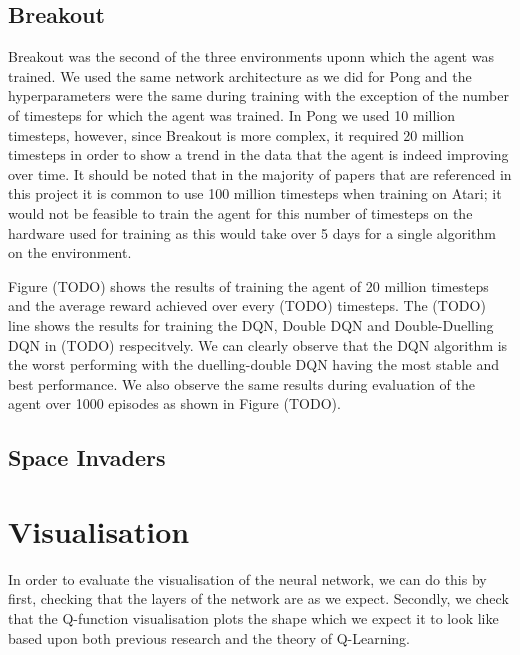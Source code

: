 \subsection{Breakout}
Breakout was the second of the three environments uponn which the agent was trained. We used the same network architecture as we did for Pong and the hyperparameters were the same during training with the exception of the number of timesteps for which the agent was trained. In Pong we used 10 million timesteps, however, since Breakout is more complex, it required 20 million timesteps in order to show a trend in the data that the agent is indeed improving over time. It should be noted that in the majority of papers that are referenced in this project it is common to use 100 million timesteps when training on Atari; it would not be feasible to train the agent for this number of timesteps on the hardware used for training as this would take over 5 days for a single algorithm on the environment.

Figure (TODO) shows the results of training the agent of 20 million timesteps and the average reward achieved over every (TODO) timesteps. The (TODO) line shows the results for training the DQN, Double DQN and Double-Duelling DQN in (TODO) respecitvely. We can clearly observe that the DQN algorithm is the worst performing with the duelling-double DQN having the most stable and best performance. We also observe the same results during evaluation of the agent over 1000 episodes as shown in Figure (TODO).

\subsection{Space Invaders}


\section{Visualisation}
In order to evaluate the visualisation of the neural network, we can do this by first, checking that the layers of the network are as we expect. Secondly, we check that the Q-function visualisation plots the shape which we expect it to look like based upon both previous research and the theory of Q-Learning.